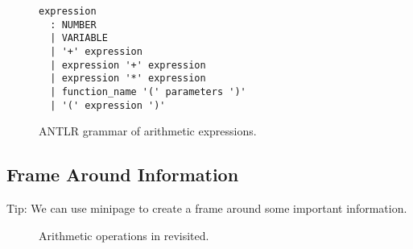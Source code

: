 \begin{figure} [htb]
\begin{verbatim}
expression
  : NUMBER
  | VARIABLE
  | '+' expression
  | expression '+' expression
  | expression '*' expression
  | function_name '(' parameters ')'
  | '(' expression ')'
\end{verbatim}
\caption{ANTLR grammar of arithmetic expressions.}
\label{fig:parser_exp}
\end{figure}

\subsection{Frame Around Information}

Tip: We can use minipage to create a frame around some important information.
\begin{figure} [h]
\caption{Arithmetic operations in \proveit revisited.}
\label{fig:aritmOp_revisit}
\end{figure}
